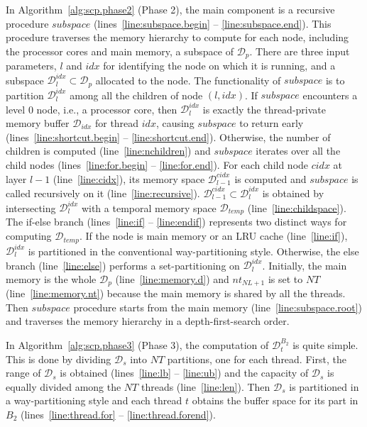 In Algorithm~\ref{alg:scp.phase2} (Phase 2),
the main component is a recursive procedure $subspace$
(lines~\ref{line:subspace.begin} -- \ref{line:subspace.end}).
This procedure traverses the memory hierarchy
to compute for each node, including the processor cores and main memory,
a subspace of $\mathcal{D}_p$.
There are three input parameters, $l$ and $idx$ for
identifying the node on which it is running,
and a subspace $\mathcal{D}_l^{idx} \subset \mathcal{D}_p$ allocated to the node. 
The functionality of $subspace$ is to partition $\mathcal{D}_l^{idx}$
among all the children of node $(l, idx)$.
If $subspace$ encounters a level 0 node, i.e., a processor core,
then $\mathcal{D}_l^{idx}$ is exactly the thread-private
memory buffer $\mathcal{D}_{idx}$ for thread $idx$,
causing $subspace$ to return early
(lines~\ref{line:shortcut.begin} -- \ref{line:shortcut.end}).
Otherwise, the number of children is computed (line~\ref{line:nchildren})
and $subspace$ iterates over all the child nodes
(lines~\ref{line:for.begin} -- \ref{line:for.end}).
For each child node $cidx$ at layer $l-1$ (line~\ref{line:cidx}),
its memory space $\mathcal{D}_{l-1}^{cidx}$ is computed
and $subspace$ is called recursively on it (line~\ref{line:recursive}).
$\mathcal{D}_{l-1}^{cidx} \subset \mathcal{D}_l^{idx}$ is obtained
by intersecting $\mathcal{D}_l^{idx}$ with
a temporal memory space $\mathcal{D}_{temp}$ (line~\ref{line:childspace}).
The if-else branch (lines~\ref{line:if} -- \ref{line:endif})
represents two distinct ways for computing
$\mathcal{D}_{temp}$.
If the node is main memory or an LRU cache (line~\ref{line:if}),
$\mathcal{D}_l^{idx}$ is partitioned in the conventional
way-partitioning style.
Otherwise, the else branch (line~\ref{line:else}) performs
a set-partitioning on $\mathcal{D}_l^{idx}$.
Initially, the main memory is the whole $\mathcal{D}_p$ (line~\ref{line:memory.d})
and $nt_{NL+1}$ is set to $NT$ (line~\ref{line:memory.nt})
because the main memory is shared by all the threads.
Then $subspace$ procedure starts from the main memory (line~\ref{line:subspace.root})
and traverses the memory hierarchy in a depth-first-search order.

In Algorithm~\ref{alg:scp.phase3} (Phase 3),
the computation of $\mathcal{D}_t^{B_2}$ is quite 
simple. This is done by dividing $\mathcal{D}_s$
into $NT$ partitions, one for each thread.
First, the range of $\mathcal{D}_s$ is obtained
(lines~\ref{line:lb} -- \ref{line:ub}) and
the capacity of $\mathcal{D}_s$ is equally
divided among the $NT$ threads (line~\ref{line:len}).
Then $\mathcal{D}_s$ is partitioned in a way-partitioning style
and each thread $t$ obtains the buffer space for its part in $B_2$
(lines~\ref{line:thread.for} -- \ref{line:thread.forend}).

